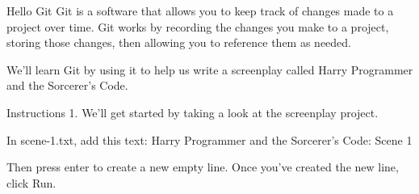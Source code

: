 Hello Git
    Git is a software that allows you to keep track of changes made to a project over time. Git works by recording the changes you make to a project, storing those changes, then allowing you to reference them as needed.

    We’ll learn Git by using it to help us write a screenplay called Harry Programmer and the Sorcerer’s Code.
    
Instructions
    1.
    We’ll get started by taking a look at the screenplay project.

    In scene-1.txt, add this text:
        Harry Programmer and the Sorcerer’s Code: Scene 1

    Then press enter to create a new empty line. Once you’ve created the new line, click Run.